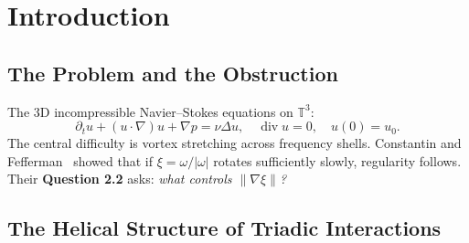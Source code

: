 \documentclass[11pt]{article}
\begin{document}
\vspace{10pt}

\begin{abstract}
We present a conditional regularity framework for the three-dimensional incompressible
Navier--Stokes equations on the periodic torus $\mathbb{T}^3$. The framework rests on three
contributions. First, a three-operator augmented system $(Q_1, Q_3, Q_6)$ that intervenes
only where spectral concentration develops. Second, the \emph{Ring Lemma}: for a solution
with Fourier support in a single Littlewood--Paley shell $S_{j^*}$ (the \emph{band-limited
regime}), the vorticity direction field $\xi = \omega/|\omega|$ satisfies
$\|\nabla\xi\|_{L^\infty} \leq C\cdot 2^{j^*}$, directly answering
Constantin--Fefferman Question~2.2 in this regime. Third, under the four-part Spectral
Non-Dispersal condition [SND], a Global Summation Lemma yields conditional global $H^1$
bounds. One precisely-stated open problem remains: whether [SND] holds for all
Leray--Hopf solutions of the classical system. No claim of unconditional regularity is made.
\end{abstract}

\section{Introduction}

\subsection{The Problem and the Obstruction}

The 3D incompressible Navier--Stokes equations on $\mathbb{T}^3$:
\[
\partial_t u + (u\cdot\nabla)u + \nabla p = \nu\Delta u,\quad
\operatorname{div} u = 0,\quad u(0)=u_0.
\]
The central difficulty is vortex stretching across frequency shells. Constantin and
Fefferman~\cite{CF1993} showed that if $\xi = \omega/|\omega|$ rotates sufficiently slowly,
regularity follows. Their \textbf{Question 2.2} asks: \textit{what controls $\|\nabla\xi\|$?}

\subsection{The Helical Structure of Triadic Interactions}
\end{document}
